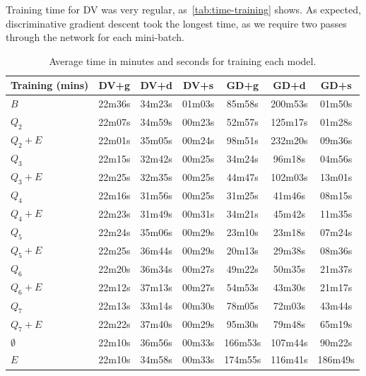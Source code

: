 Training time for DV was very regular, as~\autoref{tab:time-training} shows. As expected,
discriminative gradient descent took the longest time, as we require two passes through the network
for each mini-batch.
\begin{table}[h]
  \centering
  \begin{tabular}{l|c|c|c|c|c|c}
    \hline
    \multicolumn{1}{c}{\bfseries Training (mins)} & \multicolumn{1}{c}{\bfseries DV+g} &
    \multicolumn{1}{c}{\bfseries DV+d} & \multicolumn{1}{c}{\bfseries DV+s} &
    \multicolumn{1}{c}{\bfseries GD+g} & \multicolumn{1}{c}{\bfseries GD+d} &
    \multicolumn{1}{c}{\bfseries GD+s}\\
    \hline
    $B$         & 22m36s & 34m23s & 01m03s & 85m58s & 200m53s& 01m50s \\
    $Q_2$       & 22m07s & 34m59s & 00m23s & 52m57s & 125m17s& 01m28s \\
    $Q_2+E$     & 22m01s & 35m05s & 00m24s & 98m51s & 232m20s& 09m36s \\
    $Q_3$       & 22m15s & 32m42s & 00m25s & 34m24s & 96m18s & 04m56s \\
    $Q_3+E$     & 22m25s & 32m35s & 00m25s & 44m47s & 102m03s& 13m01s \\
    $Q_4$       & 22m16s & 31m56s & 00m25s & 31m25s & 41m46s & 08m15s \\
    $Q_4+E$     & 22m23s & 31m49s & 00m31s & 34m21s & 45m42s & 11m35s \\
    $Q_5$       & 22m24s & 35m06s & 00m29s & 23m10s & 23m18s & 07m24s \\
    $Q_5+E$     & 22m25s & 36m44s & 00m29s & 20m13s & 29m38s & 08m36s \\
    $Q_6$       & 22m20s & 36m34s & 00m27s & 49m22s & 50m35s & 21m37s \\
    $Q_6+E$     & 22m12s & 37m13s & 00m27s & 54m53s & 43m30s & 21m17s \\
    $Q_7$       & 22m13s & 33m14s & 00m30s & 78m05s & 72m03s & 43m44s \\
    $Q_7+E$     & 22m22s & 37m40s & 00m29s & 95m30s & 79m48s & 65m19s \\
    $\emptyset$ & 22m10s & 36m56s & 00m33s &166m53s & 107m44s& 90m22s \\
    $E$         & 22m10s & 34m58s & 00m33s &174m55s & 116m41s& 186m49s\\
  \end{tabular}
  \caption{Average time in minutes and seconds for training each model.\label{tab:time-training}}
\end{table}
